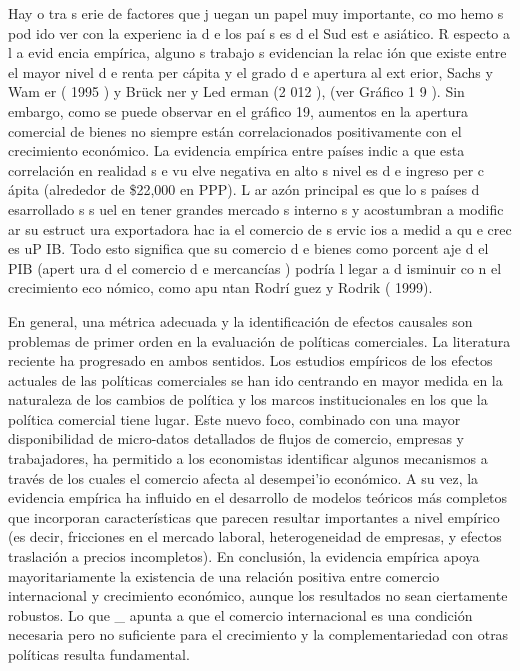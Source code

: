 \documentclass[10pt,a4paper]{article}
\begin{document}
 Hay o tra s erie de factores que j uegan un papel muy importante, co mo hemo s pod ido ver con la experienc ia d e los paí s es d el Sud est e asiático. R especto a l a evid encia empírica, alguno s trabajo s evidencian la relac ión que existe entre el mayor nivel d e renta per cápita y el grado d e apertura al ext erior, Sachs y Wam er ( 1995 ) y Brück ner y Led erman (2 012 ), (ver Gráfico 1 9 ). Sin embargo, como se puede observar en el gráfico 19, aumentos en la apertura comercial de bienes no siempre están correlacionados positivamente con el crecimiento económico. La evidencia empírica entre países indic a que esta correlación en realidad s e vu elve negativa en alto s nivel es d e ingreso per c ápita (alrededor de \$22,000 en PPP). L ar azón principal es que lo s países d esarrollado s s uel en tener grandes mercado s interno s y acostumbran a modific ar su estruct ura exportadora hac ia el comercio de s ervic ios a medid a qu e crec es uP IB. Todo esto significa que su comercio d e bienes como porcent aje d el PIB (apert ura d el comercio d e mercancías ) podría l legar a d isminuir co n el crecimiento eco nómico, como apu ntan Rodrí guez y Rodrik ( 1999).

En general, una métrica adecuada y la identificación de efectos causales son problemas de primer orden en la evaluación de políticas comerciales. La literatura reciente ha progresado en ambos sentidos. Los estudios empíricos de los efectos actuales de las políticas comerciales se han ido centrando en mayor medida en la naturaleza de los cambios de política y los marcos institucionales en los que la política comercial tiene lugar. Este nuevo foco, combinado con una mayor disponibilidad de micro-datos detallados de flujos de comercio, empresas y trabajadores, ha permitido a los economistas identificar algunos mecanismos a través de los cuales el comercio afecta al desempei'io económico. A su vez, la evidencia empírica ha influido en el desarrollo de modelos teóricos más completos que incorporan características que parecen resultar importantes a nivel empírico (es decir, fricciones en el mercado laboral, heterogeneidad de empresas, y efectos traslación a precios incompletos). En conclusión, la evidencia empírica apoya mayoritariamente la existencia de una relación positiva entre comercio internacional y crecimiento económico, aunque los resultados no sean ciertamente robustos. Lo que _ apunta a que el comercio internacional es una condición necesaria pero no suficiente para el crecimiento y la complementariedad con otras políticas resulta fundamental.
\end{document}
